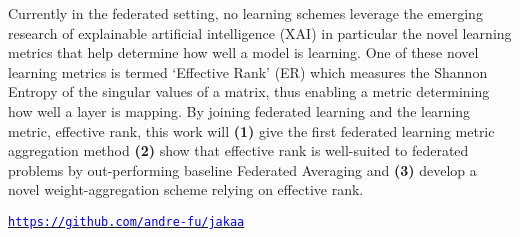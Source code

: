 Currently in the federated setting, no learning schemes leverage the emerging research of explainable artificial intelligence (XAI) in particular the novel learning metrics that help determine how well a model is learning. One of these novel learning metrics is termed `Effective Rank' (ER) which measures the Shannon Entropy of the singular values of a matrix, thus enabling a metric determining how well a layer is mapping. By joining federated learning and the learning metric, effective rank, this work will \textbf{(1)} give the first federated learning metric aggregation method \textbf{(2)} show that effective rank is well-suited to federated problems by out-performing baseline Federated Averaging \cite{konevcny2016federated} and \textbf{(3)} develop a novel weight-aggregation scheme relying on effective rank.
\begin{center}
\href{https://github.com/andre-fu/jakaa}{\textcolor{blue}{\texttt{https://github.com/andre-fu/jakaa}}}
\end{center}
